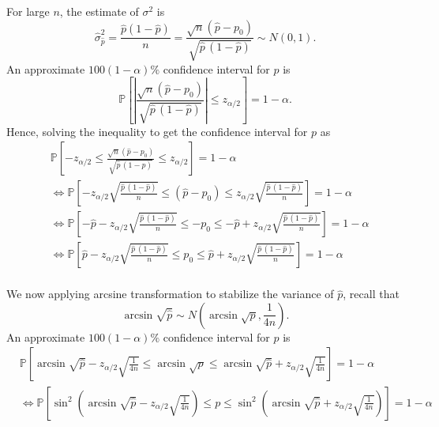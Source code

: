 For large $n$, the estimate of $\sigma^2$ is 
\begin{equation}
    \widehat{\sigma}^2_{\widehat{p}} = \frac{\widehat{p} (1 - \widehat{p})}{n} 
    = \frac{\sqrt{n} (\widehat{p} - p_0)}{\sqrt{\widehat{p}\, (1-\widehat{p})}}
    \sim N(0,1).
\end{equation}
An approximate $100(1-\alpha)\%$ confidence interval for $p$ is
\begin{equation}
    \mathbb{P} \left[ \left \vert \frac{\sqrt{n} (\widehat{p} - p_0)}{\sqrt{\widehat{p}\, (1-\widehat{p})}} \right \vert \leq z_{\alpha/2} \right] 
    = 1 - \alpha.
\end{equation}
Hence, solving the inequality to get the confidence interval for $p$ as
\begin{align*}
    &\mathbb{P} \left[ -z_{\alpha/2} \leq \frac{\sqrt{n} (\widehat{p} - p_0)}{\sqrt{\widehat{p}\, (1-\widehat{p})}} \leq z_{\alpha/2} \right] = 1 - \alpha\\
    &\Longleftrightarrow \mathbb{P} \left[ -z_{\alpha/2} \sqrt{\frac{\widehat{p}\, (1-\widehat{p})}{n}} \leq (\widehat{p} - p_0) \leq z_{\alpha/2} \sqrt{\frac{\widehat{p}\, (1-\widehat{p})}{n}} \right] = 1 - \alpha\\
    &\Longleftrightarrow \mathbb{P} \left[ -\widehat{p} -z_{\alpha/2} \sqrt{\frac{\widehat{p}\, (1-\widehat{p})}{n}} \leq -p_0 \leq -\widehat{p} + z_{\alpha/2} \sqrt{\frac{\widehat{p}\, (1-\widehat{p})}{n}} \right] = 1 - \alpha\\
    &\Longleftrightarrow \mathbb{P} \left[ \widehat{p} -z_{\alpha/2} \sqrt{\frac{\widehat{p}\, (1-\widehat{p})}{n}} \leq p_0 \leq \widehat{p} + z_{\alpha/2} \sqrt{\frac{\widehat{p}\, (1-\widehat{p})}{n}} \right] = 1 - \alpha\\
\end{align*}

We now applying arcsine transformation to stabilize the variance of $\widehat{p}$, recall that 
\begin{equation}
    \arcsin \sqrt{\widehat{p}} \sim N\left(\arcsin \sqrt{p}, \frac{1}{4n}\right).
\end{equation}
An approximate $100(1-\alpha)\%$ confidence interval for $p$ is
\begin{align*}
    &\mathbb{P} \left[ \arcsin \sqrt{\widehat{p}} - z_{\alpha / 2} \sqrt{\frac{1}{4n}} \leq \arcsin \sqrt{p} \leq \arcsin \sqrt{\widehat{p}} + z_{\alpha / 2} \sqrt{\frac{1}{4n}} \right] = 1 - \alpha\\
    &\Longleftrightarrow \mathbb{P} \left[ \sin^2 \left( \arcsin \sqrt{\widehat{p}} - z_{\alpha / 2} \sqrt{\frac{1}{4n}} \right) \leq p \leq \sin^2 \left( \arcsin \sqrt{\widehat{p}} + z_{\alpha / 2} \sqrt{\frac{1}{4n}} \right) \right] = 1 - \alpha\\
\end{align*}

